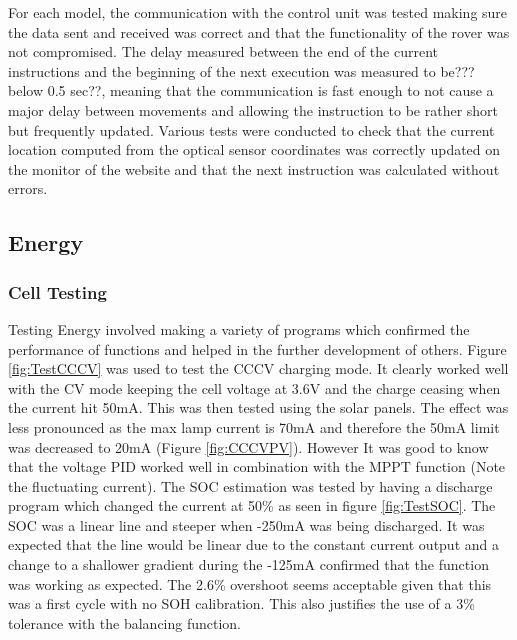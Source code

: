 \documentclass[10pt,twoside]{article}
\begin{document}
For each model, the communication with the control unit was tested making sure the data sent and received was correct and that the functionality of the rover was not compromised. The delay measured between the end of the current instructions and the beginning of the next execution was measured to be??? below 0.5 sec??, meaning that the communication is fast enough to not cause a major delay between movements and allowing the instruction to be rather short but frequently updated. Various tests were conducted to check that the current location computed from the optical sensor coordinates was correctly updated on the monitor of the website and that the next instruction was calculated without errors.

\subsection{Energy}

\subsubsection{Cell Testing}

Testing Energy involved making a variety of programs which confirmed the performance of functions and helped in the further development of others. Figure \ref{fig:TestCCCV} was used to test the CCCV charging mode. It clearly worked well with the CV mode keeping the cell voltage at 3.6V and the charge ceasing when the current hit 50mA. This was then tested using the solar panels. The effect was less pronounced as the max lamp current is 70mA and therefore the 50mA limit was decreased to 20mA (Figure \ref{fig:CCCVPV}). However It was good to know that the voltage PID worked well in combination with the MPPT function (Note the fluctuating current). The SOC estimation was tested by having a discharge program which changed the current at 50\% as seen in figure \ref{fig:TestSOC}. The SOC was a linear line and steeper when -250mA was being discharged. It was expected that the line would be linear due to the constant current output and a change to a shallower gradient during the -125mA confirmed that the function was working as expected. The 2.6\% overshoot seems acceptable given that this was a first cycle with no SOH calibration. This also justifies the use of a 3\% tolerance with the balancing function.  
\end{document}
